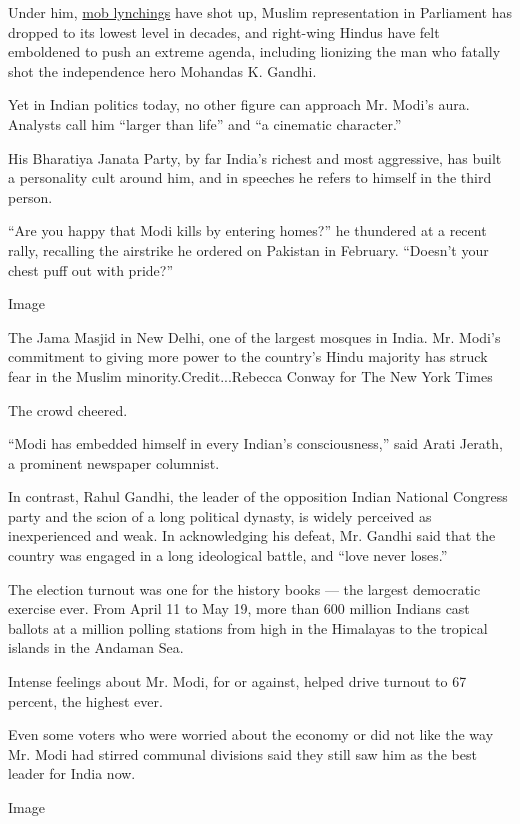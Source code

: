 Under him,
\href{https://www.hrw.org/report/2019/02/18/violent-cow-protection-india/vigilante-groups-attack-minorities}{mob
lynchings} have shot up, Muslim representation in Parliament has dropped
to its lowest level in decades, and right-wing Hindus have felt
emboldened to push an extreme agenda, including lionizing the man who
fatally shot the independence hero Mohandas K. Gandhi.

Yet in Indian politics today, no other figure can approach Mr. Modi's
aura. Analysts call him ``larger than life'' and ``a cinematic
character.''

His Bharatiya Janata Party, by far India's richest and most aggressive,
has built a personality cult around him, and in speeches he refers to
himself in the third person.

``Are you happy that Modi kills by entering homes?'' he thundered at a
recent rally, recalling the airstrike he ordered on Pakistan in
February. ``Doesn't your chest puff out with pride?''

Image

The Jama Masjid in New Delhi, one of the largest mosques in India. Mr.
Modi's commitment to giving more power to the country's Hindu majority
has struck fear in the Muslim minority.Credit...Rebecca Conway for The
New York Times

The crowd cheered.

``Modi has embedded himself in every Indian's consciousness,'' said
Arati Jerath, a prominent newspaper columnist.

In contrast, Rahul Gandhi, the leader of the opposition Indian National
Congress party and the scion of a long political dynasty, is widely
perceived as inexperienced and weak. In acknowledging his defeat, Mr.
Gandhi said that the country was engaged in a long ideological battle,
and ``love never loses.''

The election turnout was one for the history books --- the largest
democratic exercise ever. From April 11 to May 19, more than 600 million
Indians cast ballots at a million polling stations from high in the
Himalayas to the tropical islands in the Andaman Sea.

Intense feelings about Mr. Modi, for or against, helped drive turnout to
67 percent, the highest ever.

Even some voters who were worried about the economy or did not like the
way Mr. Modi had stirred communal divisions said they still saw him as
the best leader for India now.

Image

